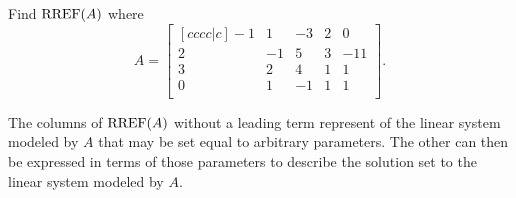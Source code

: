 \begin{applicationActivities}{3}{6}
\begin{activity}{15}
  Find \(\operatorname{RREF}(A)\) where
  \[A=
    \begin{bmatrix}[cccc|c]
      -1 &  1 & -3 &  2 &  0 \\
       2 & -1 &  5 &  3 & -11 \\
       3 &  2 &  4 &  1 &  1 \\
       0 &  1 & -1 &  1 &  1 \\
    \end{bmatrix}
  .\]
\end{activity}

\begin{definition}
  The columns of \(\operatorname{RREF}(A)\) without a leading term represent
   of the linear system modeled by \(A\)
  that may be set equal to arbitrary parameters.
  The other  can then be expressed in terms
  of those parameters to describe the solution set
  to the linear system modeled by \(A\).
\end{definition}


\end{applicationActivities}
